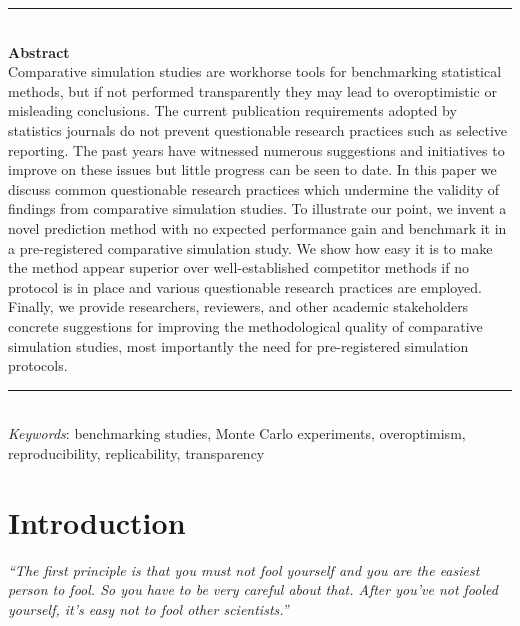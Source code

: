 \documentclass[a4paper, 11pt]{article}
\title{
  \vspace{-2em}
  \textbf{\longtitle} \\
  \subtitle
}
\author{
  \textbf{\longauthors} \\
  \affiliation \\
  \small\{samuel.pawel, lucasheinrich.kook, kelly.reeve\}@uzh.ch
}
\date{} %
\begin{document}
\maketitle

\begin{center}
\begin{minipage}{13cm}
{\small
\rule{\textwidth}{0.5pt} \\
{\centering \textbf{Abstract} \\
Comparative simulation studies are workhorse tools for benchmarking statistical methods,
but if not performed transparently they may lead to 
overoptimistic or misleading conclusions. The current publication requirements adopted by 
statistics journals do not prevent questionable research practices such as selective 
reporting. The past years have witnessed 
numerous suggestions and initiatives to improve on these issues but little progress can be seen to date. In this 
paper we discuss common questionable research practices which undermine the validity 
of findings from comparative simulation studies. To illustrate our point, we invent 
a novel prediction method with no expected performance gain and benchmark it in a pre-registered
comparative simulation study. We show how easy it is to make the method 
appear superior over well-established competitor methods if no protocol is in place 
and various questionable research practices are employed. Finally, we provide researchers,
reviewers, and other academic stakeholders concrete suggestions for improving the 
methodological quality of comparative simulation studies, most importantly the
need for pre-registered simulation protocols.
}
\rule{\textwidth}{0.4pt} \\
\textit{Keywords}: 
benchmarking studies, Monte Carlo experiments, overoptimism, 
reproducibility, replicability, transparency
}
\end{minipage}
\end{center}

\section{Introduction}

\begin{center}
\begin{minipage}{12cm}
\emph{``The first principle is that you must not fool yourself and you are
the easiest person to fool. So you have to be very careful about that.
After you've not fooled yourself, it's easy not to fool other scientists.''}
\end{minipage}
\end{center}
\begin{flushright}
\citet[p.~12]{Feynman1974}
\end{flushright}
\end{document}
